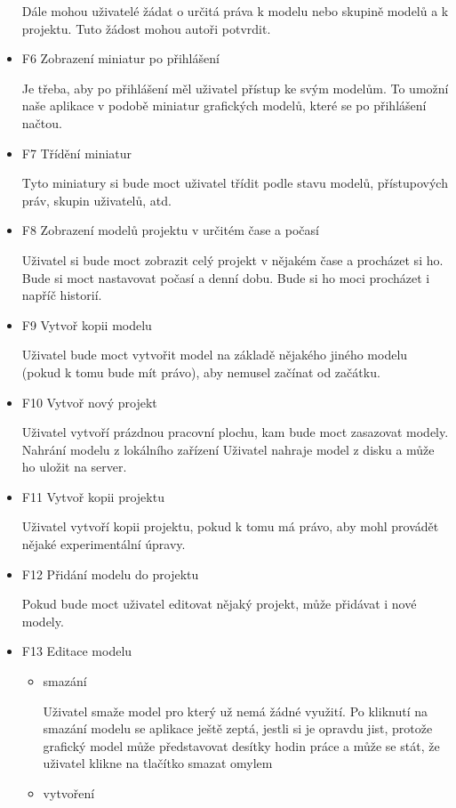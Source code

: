 \documentclass[thesis=B,czech]{FITthesis}[2012/06/26]
\begin{document}
\begin{itemize}
                Dále mohou uživatelé žádat o určitá práva k modelu nebo skupině modelů a k projektu. Tuto žádost mohou autoři potvrdit.
                \item F6 Zobrazení miniatur po přihlášení
                
                Je třeba, aby po přihlášení měl uživatel přístup ke svým modelům. To umožní naše aplikace v podobě miniatur grafických modelů, které se po přihlášení načtou.
                \item F7 Třídění miniatur
                
                Tyto miniatury si bude moct uživatel třídit podle stavu modelů, přístupových práv, skupin uživatelů, atd.
                \item F8 Zobrazení modelů projektu v určitém čase a počasí
                
                Uživatel si bude moct zobrazit celý projekt v nějakém čase a procházet si ho. Bude si moct nastavovat počasí a denní dobu. Bude si ho moci procházet i napříč historií.
                \item F9 Vytvoř kopii modelu
                
                Uživatel bude moct vytvořit model na základě nějakého jiného modelu (pokud k tomu bude mít právo), aby nemusel začínat od začátku.
                \item F10 Vytvoř nový projekt
                
                Uživatel vytvoří prázdnou pracovní plochu, kam bude moct zasazovat modely.
                Nahrání modelu z lokálního zařízení
                Uživatel nahraje model z disku a může ho uložit na server.
               \item F11 Vytvoř kopii projektu
               
                Uživatel vytvoří kopii projektu, pokud k tomu má právo, aby mohl provádět nějaké experimentální úpravy.
                \item F12 Přidání modelu do projektu
                
                Pokud bude moct uživatel editovat nějaký projekt, může přidávat i nové modely.
               \item F13 Editace modelu
               
               \begin{itemize}
                    \item smazání
                   
                    Uživatel smaže model pro který už nemá žádné využití. Po kliknutí na smazání modelu se aplikace ještě zeptá, jestli si je opravdu jist, protože grafický model může představovat desítky hodin práce a může se stát, že uživatel klikne na tlačítko smazat omylem
                    \item vytvoření
                    

\end{itemize}
\end{itemize}
\end{document}
